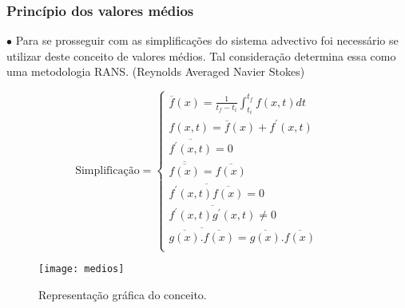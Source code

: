 \documentclass[xcolor=dvipsnames,10pt,aspectratio=169]{beamer}
\begin{document}
		\begin{frame}
			\frametitle{Princípio dos valores médios}
			$\bullet$ Para se prosseguir com as simplificações do sistema advectivo foi necessário se utilizar deste conceito de valores médios. Tal consideração determina essa como uma metodologia RANS. (Reynolds Averaged Navier Stokes)
			\\
			\begin{minipage}[h!]{0.45\textwidth}
				\begin{equation*}
				\label{ola}
				\text{Simplificação}=
				\begin{cases}
				\overline{f}({x})=\frac{1}{t_f - t_i} \int_{t_i}^{t_f} f({x} , t) dt      & \quad  \\
				f({x} , t) = \overline{f}({x}) + f^\prime ({x} ,t)  & \quad   \\
				\overline{f^\prime ({x} ,t)} = 0  & \quad   \\
				\overline{\overline{f({x})}} = \overline{f({x})}  & \quad   \\
				\overline{f^\prime ({x} ,t)\overline{f({x})}} = 0  & \quad   \\
				\overline{f^\prime ({x} ,t)g^\prime ({x} ,t)} \neq 0  & \quad   \\
				\overline{  \overline{g({x})}. \overline{f({x})}  } = {\overline{g({x})}} . {\overline{f({x})}}  & \quad   \\
				\end{cases}
				\end{equation*}
			\end{minipage}\hfill
			\begin{minipage}[h!]{0.45\textwidth}
				\begin{figure}
					\centering
					\texttt{[image: medios]}
					\caption{Representação gráfica do conceito.}
					\label{medios}
				\end{figure}
			\end{minipage}
	     	\\
		\end{frame}
	
	
	
	
	
\end{document}
